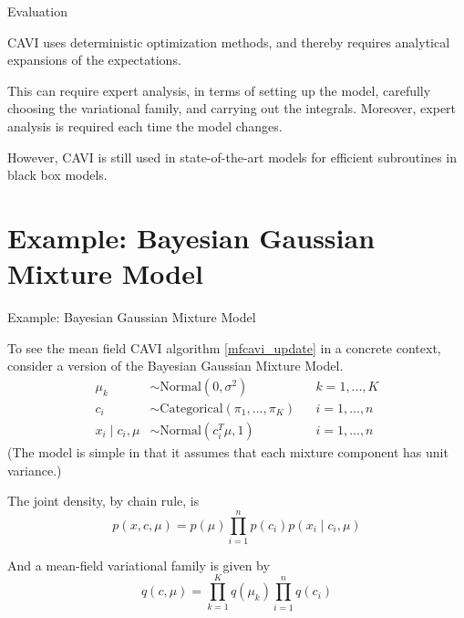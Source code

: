 \documentclass[10pt]{beamer}
\newcommand{\ds}{\displaystyle}
\newcommand{\+}[1]{\ensuremath{{\boldsymbol #1}}} %
\newcommand{\cond}{\; | \;}
\newcommand{\red}[1]{\color{red}{#1}  \color{black}}
\newcommand{\green}[1]{\color{green}{#1}  \color{black}}
\newcommand{\bbvi}{\,\texttt{bbvi}\,}
\newcommand{\cmark}{\ding{51}}%
\newcommand{\xmark}{\ding{55}}%
\newcommand{\greencheck}{\green{\cmark}}
\newcommand{\redx}{\red{\xmark}}
\begin{document}
\begin{frame}{Evaluation}

CAVI uses deterministic optimization methods, and thereby requires analytical expansions of the expectations. 

\vfill

\redx This can require expert analysis, in terms of setting up the model, carefully choosing the variational family, and carrying out the integrals.  Moreover, expert analysis is required each time the model changes.%
 
\vfill

\greencheck  However, CAVI is still used in state-of-the-art models for efficient subroutines in black box models. %

\end{frame}


\section{Example: Bayesian Gaussian Mixture Model}
\begin{frame}{Example: Bayesian Gaussian Mixture Model}

To see the mean field CAVI algorithm \eqref{mfcavi_update} in a concrete context, consider a version of the Bayesian Gaussian Mixture Model.  
\begin{align*}
\mu_k & \sim \text{Normal}(0, \sigma^2) && k = 1,..., K\\
c_i & \sim \text{Categorical}(\pi_1, ..., \pi_K) && i=1, ... ,n \\
x_i \cond c_i, \mu & \sim \text{Normal}(c_i^T \mu, 1) && i = 1,..., n
\end{align*}
\tiny (The model is simple in that it assumes that each mixture component has unit variance.) \normalsize 

The joint density, by chain rule, is
\[ p(x,c,\mu) = p(\mu) \ds\prod_{i=1}^n p(c_i) p(x_i \cond c_i, \mu) \]

And a mean-field variational family is given by 
\[  q(c, \mu) = \ds\prod_{k=1}^K q(\mu_k) \ds\prod_{i=1}^n q(c_i) \]

\end{frame}
\end{document}
